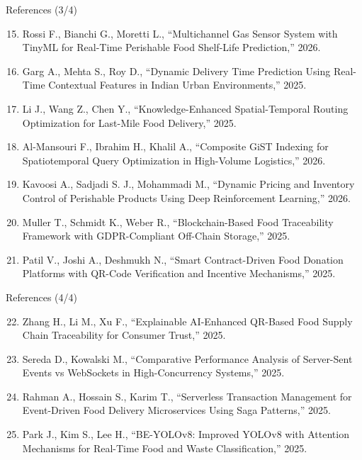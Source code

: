 \documentclass[aspectratio=169,xcolor=dvipsnames]{beamer}
\begin{document}
\begin{frame}{References (3/4)}
\tiny
\begin{enumerate}
\setcounter{enumi}{14}
    \item Rossi F., Bianchi G., Moretti L., ``Multichannel Gas Sensor System with TinyML for Real-Time Perishable Food Shelf-Life Prediction,'' 2026.

    \item Garg A., Mehta S., Roy D., ``Dynamic Delivery Time Prediction Using Real-Time Contextual Features in Indian Urban Environments,'' 2025.

    \item Li J., Wang Z., Chen Y., ``Knowledge-Enhanced Spatial-Temporal Routing Optimization for Last-Mile Food Delivery,'' 2025.

    \item Al-Mansouri F., Ibrahim H., Khalil A., ``Composite GiST Indexing for Spatiotemporal Query Optimization in High-Volume Logistics,'' 2026.

    \item Kavoosi A., Sadjadi S. J., Mohammadi M., ``Dynamic Pricing and Inventory Control of Perishable Products Using Deep Reinforcement Learning,'' 2026.

    \item Muller T., Schmidt K., Weber R., ``Blockchain-Based Food Traceability Framework with GDPR-Compliant Off-Chain Storage,'' 2025.

    \item Patil V., Joshi A., Deshmukh N., ``Smart Contract-Driven Food Donation Platforms with QR-Code Verification and Incentive Mechanisms,'' 2025.
\end{enumerate}
\end{frame}

\begin{frame}{References (4/4)}
\tiny
\begin{enumerate}
\setcounter{enumi}{21}
    \item Zhang H., Li M., Xu F., ``Explainable AI-Enhanced QR-Based Food Supply Chain Traceability for Consumer Trust,'' 2025.

    \item Sereda D., Kowalski M., ``Comparative Performance Analysis of Server-Sent Events vs WebSockets in High-Concurrency Systems,'' 2025.

    \item Rahman A., Hossain S., Karim T., ``Serverless Transaction Management for Event-Driven Food Delivery Microservices Using Saga Patterns,'' 2025.

    \item Park J., Kim S., Lee H., ``BE-YOLOv8: Improved YOLOv8 with Attention Mechanisms for Real-Time Food and Waste Classification,'' 2025.
\end{enumerate}
\end{frame}

\end{document}
